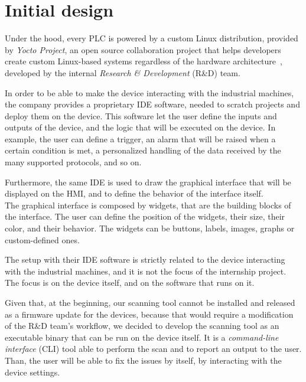 



\section{Initial design}

Under the hood, every PLC is powered by a custom Linux distribution, provided by \textit{Yocto Project}, an open source collaboration project that helps developers create custom Linux-based systems regardless of the hardware architecture~\cite{yocto-project}, developed by the internal \textit{Research \& Development} (R\&D) team.

In order to be able to make the device interacting with the industrial machines, the company provides a proprietary IDE software, needed to scratch projects and deploy them on the device. This software let the user define the inputs and outputs of the device, and the logic that will be executed on the device. In example, the user can define a trigger, an alarm that will be raised when a certain condition is met, a personalized handling of the data received by the many supported protocols, and so on.

Furthermore, the same IDE is used to draw the graphical interface that will be displayed on the HMI, and to define the behavior of the interface itself.\\
The graphical interface is composed by widgets, that are the building blocks of the interface. The user can define the position of the widgets, their size, their color, and their behavior. The widgets can be buttons, labels, images, graphs or custom-defined ones.

The setup with their IDE software is strictly related to the device interacting with the industrial machines, and it is not the focus of the internship project. The focus is on the device itself, and on the software that runs on it.

Given that, at the beginning, our scanning tool cannot be installed and released as a firmware update for the devices, because that would require a modification of the R\&D team's workflow, we decided to develop the scanning tool as an executable binary that can be run on the device itself. It is a \textit{command-line interface} (CLI) tool able to perform the scan and to report an output to the user. Than, the user will be able to fix the issues by itself, by interacting with the device settings.

